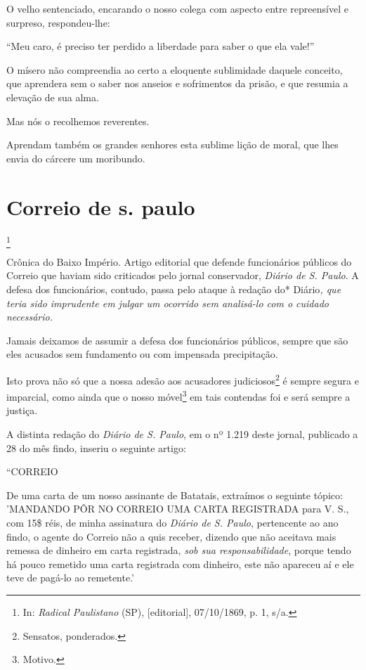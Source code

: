 O velho sentenciado, encarando o nosso colega com aspecto entre
repreensível e surpreso, respondeu-lhe:

``Meu caro, é preciso ter perdido a liberdade para saber o que ela vale!''

O mísero não compreendia ao certo a eloquente sublimidade daquele
conceito, que aprendera sem o saber nos anseios e sofrimentos da prisão,
e que resumia a elevação de sua alma.

Mas nós o recolhemos reverentes.

\noindent\dotfill

Aprendam também os grandes senhores esta sublime lição de moral, que
lhes envia do cárcere um moribundo.

\chapter{Correio de s. paulo}\footnote{In: \emph{Radical Paulistano} (SP),
  {[}editorial{]}, 07/10/1869, p. 1, s/a.}

\begin{didascalia}
Crônica do Baixo Império. Artigo editorial que defende funcionários
públicos do Correio que haviam sido criticados pelo jornal
conservador,\emph{ Diário de S. Paulo}. A defesa dos funcionários,
contudo, passa pelo ataque à redação do* Diário\emph{, que teria sido
imprudente em julgar um ocorrido sem analisá-lo com o cuidado
necessário.}
\end{didascalia}

\asterisc{}

Jamais deixamos de assumir a defesa dos funcionários públicos, sempre
que são eles acusados sem fundamento ou com impensada precipitação.

Isto prova não só que a nossa adesão aos acusadores
judiciosos\footnote{Sensatos, ponderados.} é sempre segura e
imparcial, como ainda que o nosso móvel\footnote{Motivo.} em tais
contendas foi e será sempre a justiça.

A distinta redação do \emph{Diário de S. Paulo}, em o nº 1.219 deste
jornal, publicado a 28 do mês findo, inseriu o seguinte artigo:

``CORREIO

De uma carta de um nosso assinante de Batatais, extraímos o seguinte
tópico: 'MANDANDO PÔR NO CORREIO UMA CARTA REGISTRADA para V. S., com
15\$ réis, de minha assinatura do \emph{Diário de S. Paulo}, pertencente
ao ano findo, o agente do Correio não a quis receber, dizendo que não
aceitava mais remessa de dinheiro em carta registrada, \emph{sob sua
responsabilidade}, porque tendo há pouco remetido uma carta registrada
com dinheiro, este não apareceu aí e ele teve de pagá-lo ao remetente.'

